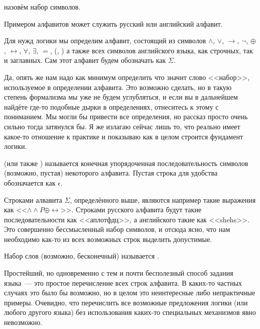 \begin{definition}
 назовём набор символов.
\end{definition}

\begin{example}
Примером алфавитов может служить русский или английский алфавит.
\end{example}

\begin{example}
Для нужд логики мы определим алфавит, состоящий из символов $\land$, $\lor$, $\to$, $\neg$, $\oplus$, $\leftrightarrow$, $\forall$, $\exists$, $=$, (, ) а также всех символов английского языка, как строчных, так и заглавных. Сам этот алфавит будем обозначать как $\Sigma$.
\end{example}

Да, опять же нам надо как минимум определить что значит слово <<набор>>, используемое в определении алфавита. Это возможно сделать, но в такую степень формализма мы уже не будем углубляться, и если вы в дальнейшем найдёте где-то подобные дырки в определениях, отнеситесь к этому с пониманием. Мы могли бы привести все определения, но рассказ просто очень сильно тогда затянулся бы. Я же излагаю сейчас лишь то, что реально имеет какое-то отношение к практике и показываю как в целом строится фундамент логики.

\begin{definition}
 (или также ) называется конечная упорядоченная последовательность символов (возможно, пустая) некоторого алфавита. Пустая строка для удобства обозначается как $\epsilon$.
\end{definition}

Строками алвавита $\Sigma$, определённого выше, являются например такие выражения как <<$\land\land P\oplus\leftrightarrow$>>. Строками русского алфавита будут такие последовательности как <<аплотфдц>>, а английского такие как <<shehs>>. Это совершенно бессмысленный набор символов, и отсюда ясно, что нам необходимо как-то из всех возможных строк выделить допустимые.

\begin{definition}
Набор слов (возможно, бесконечный) называется .
\end{definition}

Простейший, но одновременно с тем и почти бесполезный способ задания языка~--- это простое перечисление всех строк алфавита. В каких-то частных случаях это было бы возможно, но в целом это неинтересные либо непрактичные примеры. Очевидно, что перечислить все возможные предложения логики (или любого другого языка) без использования каких-то специальных механизмов явно невозможно.

